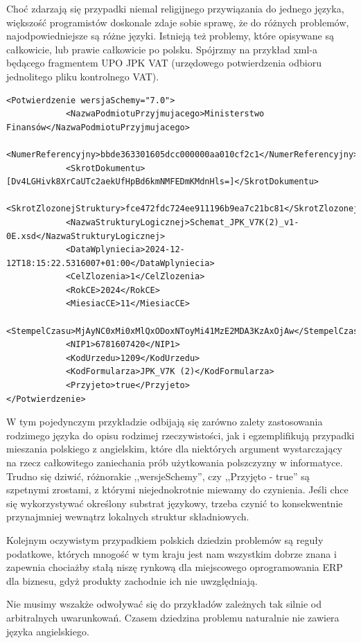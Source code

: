Choć zdarzają się przypadki niemal religijnego przywiązania do jednego języka, większość programistów doskonale zdaje sobie sprawę, że do różnych problemów, najodpowiedniejsze są różne języki. Istnieją też problemy, które opisywane są całkowicie, lub prawie całkowicie po polsku. Spójrzmy na przykład xml-a będącego fragmentem UPO JPK VAT (urzędowego potwierdzenia odbioru jednolitego pliku kontrolnego VAT).
\begin{lstlisting}
<Potwierdzenie wersjaSchemy="7.0">
            <NazwaPodmiotuPrzyjmujacego>Ministerstwo Finansów</NazwaPodmiotuPrzyjmujacego>
            <NumerReferencyjny>bbde363301605dcc000000aa010cf2c1</NumerReferencyjny>
            <SkrotDokumentu>[Dv4LGHivk8XrCaUTc2aekUfHpBd6kmNMFEDmKMdnHls=]</SkrotDokumentu>
            <SkrotZlozonejStruktury>fce472fdc724ee911196b9ea7c21bc81</SkrotZlozonejStruktury>
            <NazwaStrukturyLogicznej>Schemat_JPK_V7K(2)_v1-0E.xsd</NazwaStrukturyLogicznej>
            <DataWplyniecia>2024-12-12T18:15:22.5316007+01:00</DataWplyniecia>
            <CelZlozenia>1</CelZlozenia>
            <RokCE>2024</RokCE>
            <MiesiacCE>11</MiesiacCE>
            <StempelCzasu>MjAyNC0xMi0xMlQxODoxNToyMi41MzE2MDA3KzAxOjAw</StempelCzasu>
            <NIP1>6781607420</NIP1>
            <KodUrzedu>1209</KodUrzedu>
            <KodFormularza>JPK_V7K (2)</KodFormularza>
            <Przyjeto>true</Przyjeto>
</Potwierdzenie>
\end{lstlisting}
W tym pojedynczym przykładzie odbijają się zarówno zalety zastosowania rodzimego języka do opisu rodzimej rzeczywistości, jak i egzemplifikują przypadki mieszania polskiego z angielskim, które dla niektórych argument wystarczający na rzecz całkowitego zaniechania prób użytkowania polszczyzny w informatyce. Trudno się dziwić, różnorakie ,,wersjeSchemy'', czy ,,Przyjęto - true'' są szpetnymi zrostami, z którymi niejednokrotnie miewamy do czynienia. Jeśli chce się wykorzystywać określony substrat językowy, trzeba czynić to konsekwentnie przynajmniej wewnątrz lokalnych struktur składniowych.

Kolejnym oczywistym przypadkiem polskich dziedzin problemów są reguły podatkowe, których mnogość w tym kraju jest nam wszystkim dobrze znana i zapewnia chociażby stałą niszę rynkową dla miejscowego oprogramowania ERP dla biznesu, gdyż produkty zachodnie ich nie uwzględniają.

Nie musimy wszakże odwoływać się do przykładów zależnych tak silnie od arbitralnych uwarunkowań. Czasem dziedzina problemu naturalnie nie zawiera języka angielskiego. 

